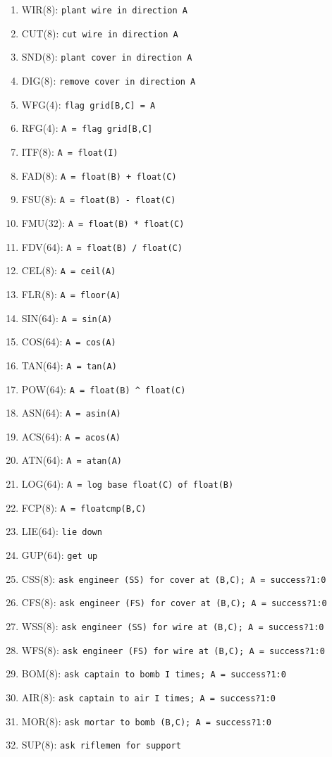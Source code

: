 \documentclass{article}
\begin{document}
\begin{enumerate}[noitemsep]
    \item WIR(8): \texttt{plant wire in direction A}
    \item CUT(8): \texttt{cut wire in direction A}
    \item SND(8): \texttt{plant cover in direction A}
    \item DIG(8): \texttt{remove cover in direction A}
    \item WFG(4): \texttt{flag grid[B,C] = A}
    \item RFG(4): \texttt{A = flag grid[B,C]}
    \item ITF(8): \texttt{A = float(I)}
    \item FAD(8): \texttt{A = float(B) + float(C)}
    \item FSU(8): \texttt{A = float(B) - float(C)}
    \item FMU(32): \texttt{A = float(B) * float(C)}
    \item FDV(64): \texttt{A = float(B) / float(C)}
    \item CEL(8): \texttt{A = ceil(A)}
    \item FLR(8): \texttt{A = floor(A)}
    \item SIN(64): \texttt{A = sin(A)}
    \item COS(64): \texttt{A = cos(A)}
    \item TAN(64): \texttt{A = tan(A)}
    \item POW(64): \texttt{A = float(B) \^{} float(C)}
    \item ASN(64): \texttt{A = asin(A)}
    \item ACS(64): \texttt{A = acos(A)}
    \item ATN(64): \texttt{A = atan(A)}
    \item LOG(64): \texttt{A = log base float(C) of float(B)}
    \item FCP(8): \texttt{A = floatcmp(B,C)}
    \item LIE(64): \texttt{lie down}
    \item GUP(64): \texttt{get up}
    \item CSS(8): \texttt{ask engineer (SS) for cover at (B,C); A = success?1:0}
    \item CFS(8): \texttt{ask engineer (FS) for cover at (B,C); A = success?1:0}
    \item WSS(8): \texttt{ask engineer (SS) for wire at (B,C); A = success?1:0}
    \item WFS(8): \texttt{ask engineer (FS) for wire at (B,C); A = success?1:0}
    \item BOM(8): \texttt{ask captain to bomb I times; A = success?1:0}
    \item AIR(8): \texttt{ask captain to air I times; A = success?1:0}
    \item MOR(8): \texttt{ask mortar to bomb (B,C); A = success?1:0}
    \item SUP(8): \texttt{ask riflemen for support}
\end{enumerate}
\end{document}
